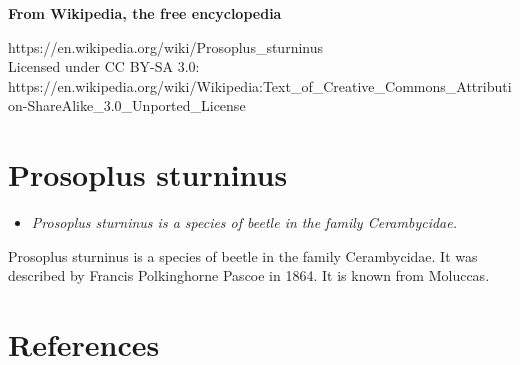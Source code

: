 \textbf{From Wikipedia, the free encyclopedia}

https://en.wikipedia.org/wiki/Prosoplus\_sturninus\\
Licensed under CC BY-SA 3.0:\\
https://en.wikipedia.org/wiki/Wikipedia:Text\_of\_Creative\_Commons\_Attribution-ShareAlike\_3.0\_Unported\_License

\section{Prosoplus sturninus}\label{prosoplus-sturninus}

\begin{itemize}
\item
  \emph{Prosoplus sturninus is a species of beetle in the family
  Cerambycidae.}
\end{itemize}

Prosoplus sturninus is a species of beetle in the family Cerambycidae.
It was described by Francis Polkinghorne Pascoe in 1864. It is known
from Moluccas.

\section{References}\label{references}

